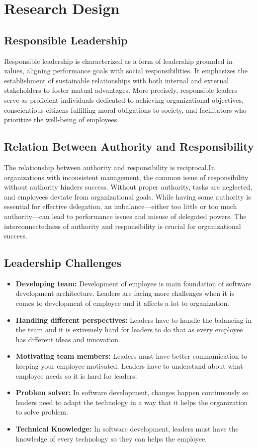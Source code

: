 \documentclass[a4paper,12pt]{report}
\begin{document}
\fontsize{14}{16}\selectfont \chapter{Research Design}
\fontsize{14}{16}\selectfont \section{Responsible Leadership}
\fontsize{14}{20}\selectfont Responsible leadership is characterized as a form of leadership grounded in values, aligning performance goals with social responsibilities. It emphasizes the establishment of sustainable relationships with both internal and external stakeholders to foster mutual advantages. More precisely, responsible leaders serve as proficient individuals dedicated to achieving organizational objectives, conscientious citizens fulfilling moral obligations to society, and facilitators who prioritize the well-being of employees.
\fontsize{14}{16}\selectfont \section{Relation Between Authority and Responsibility}
\fontsize{14}{20}\selectfont  The relationship between authority and responsibility is reciprocal.In organizations with inconsistent management, the common issue of responsibility without authority hinders success. Without proper authority, tasks are neglected, and employees deviate from organizational goals. While having some authority is essential for effective delegation, an imbalance—either too little or too much authority—can lead to performance issues and misuse of delegated powers. The interconnectedness of authority and responsibility is crucial for organizational success.
\fontsize{14}{16}\selectfont \section{Leadership Challenges}
\fontsize{14}{20}\selectfont   
\begin{itemize}
\item  \textbf{Developing team:} Development of employee is main foundation of software development architecture. Leaders are facing more challenges when it is comes to development of employee and it affects a lot to organization.
\item  \textbf{Handling different perspectives:} Leaders have to handle the balancing in the team and it is extremely hard for leaders to do that as every employee has different ideas and innovation.
\item \textbf{Motivating team members:} Leaders must have better communication to keeping your employee motivated. Leaders have to understand about what employee needs so it is hard for leaders.
\item \textbf{Problem solver:} In software development, changes happen continuously so leaders need to adapt the technology in a way that it helps the organization to solve problem.
\item \textbf{Technical Knowledge:} In software development, leaders must have the knowledge of every technology so they can helps the employee. 
\end{itemize}
\end{document}
